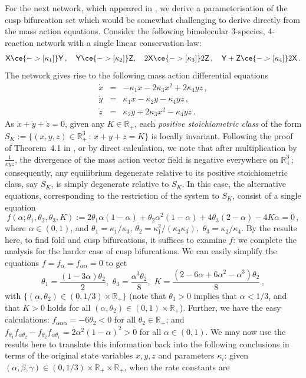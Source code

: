 \documentclass[11pt]{amsart}
\renewcommand{\k}{\kappa}
\renewcommand{\t}{\theta}
\newcommand{\R}{\mathbb{R}}
\newcommand{\fX}{\mathsf{X}}
\newcommand{\fY}{\mathsf{Y}}
\newcommand{\fZ}{\mathsf{Z}}
\theoremstyle{definition}
\newenvironment{ex}
  {\pushQED{\qed}\renewcommand{\qedsymbol}{$\Diamond$}\example}
  {\popQED\endexample}
\begin{document}
For the next network, which appeared in \cite[Example 4.34]{banajifeliu26}, we derive a parameterisation of the cusp bifurcation set which would be somewhat challenging to derive directly from the mass action equations.  
\begin{ex}
 \label{ex342b}
Consider the following bimolecular 3-species, 4-reaction network with a single linear conservation law:
\[
\fX \ce{->[\k_1]} \fY\,,\quad \fY \ce{->[\k_2]} \fZ,\quad 2\fX \ce{->[\k_3]} 2\fZ\,,\quad \fY+\fZ \ce{->[\k_4]} 2\fX\,.
\]
The network gives rise to the following mass action differential equations
\[
\begin{array}{rcl}
\dot x &=& -\k_1 x - 2\k_3 x^2 + 2\k_4 yz\,,\\
\dot y &=& \k_1 x - \k_2 y - \k_4 yz\,,\\
\dot z &=& \k_2 y + 2\k_3 x^2 - \k_4 yz\,.
\end{array}
\]
As $\dot x + \dot y + \dot z = 0$, given any $K \in \R_+$, each {\em positive stoichiometric class} of the form $S_K:=\{(x,y,z) \in \R^3_+\,:\, x+y+z = K\}$ is locally invariant. Following the proof of Theorem~4.1 in \cite{boros:hofbauer:2022}, or by direct calculation, we note that after multiplication by $\frac{1}{xyz}$, the divergence of the mass action vector field is negative everywhere on $\R^3_+$; consequently, any equilibrium degenerate relative to its positive stoichiometric class, say $S_K$, is simply degenerate relative to $S_K$. In this case, the alternative equations, corresponding to the restriction of the system to $S_K$, consist of a single equation
\begin{equation}
  \label{eqpoly2}
f(\alpha; \t_1, \t_2, \t_3, K):=2\t_1\alpha(1-\alpha)+\t_2\alpha^{2}(1-\alpha) + 4\t_3(2-\alpha) -4K\alpha = 0\,,
\end{equation}
where $\alpha \in (0,1)$, and $\t_1 = \k_1/\k_3,\,\t_2=\k_1^2/(\k_2\k_3),\,\,\t_3=\k_2/\k_4$. By the results here, to find fold and cusp bifurcations, it suffices to examine $f$: we complete the analysis for the harder case of cusp bifurcations. We can easily simplify the equations $f = f_\alpha = f_{\alpha \alpha} = 0$ to get
\[
\t_1 = \frac{(1-3\alpha)\t_2}{2},\,\, \t_3 = \frac{\alpha^3 \t_2}{8},\,\, K = \frac{(2-6\alpha+6\alpha^2-\alpha^3)\t_2}{8}\,, 
\]
with $\{(\alpha, \t_2) \in (0,1/3) \times \R_+\}$ (note that $\t_1 > 0$ implies that $\alpha<1/3$, and that $K>0$ holds for all $(\alpha,\theta_2) \in (0,1) \times \R_+$). Further, we have the easy calculations: $f_{\alpha\alpha\alpha} = -6\t_2 < 0$ for all $\t_2 \in \R_+$; and $f_{\t_1}f_{\alpha\t_2}-f_{\t_2}f_{\alpha \t_1} = 2\alpha^2(1-\alpha)^2>0$ for all $\alpha \in (0,1)$. We may now use the results here to translate this information back into the following conclusions in terms of the original state variables $x,y,z$ and parameters $\k_i$: given $(\alpha, \beta, \gamma) \in (0,1/3) \times \R_+ \times \R_+$, when the rate constants are

\end{ex}
\end{document}
